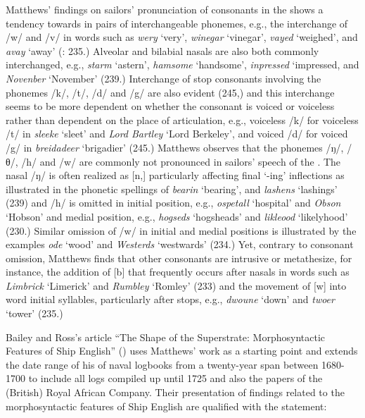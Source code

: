 Matthews’ findings on sailors’ pronunciation of consonants in the  shows a tendency towards  in pairs of interchangeable phonemes, e.g., the interchange of /w/ and /v/ in words such as \textit{wery} ‘very’, \textit{winegar} ‘vinegar’, \textit{vayed} ‘weighed’, and \textit{avay} ‘away’ (\citealt{Matthews1935}: 235.) Alveolar and bilabial nasals are also both commonly interchanged, e.g., \textit{starm} ‘astern’, \textit{hamsome} ‘handsome’, \textit{inpressed} ‘impressed, and \textit{Novenber} ‘November’ (239.) Interchange of stop consonants involving the phonemes /k/, /t/, /d/ and /g/ are also evident (245,) and this interchange seems to be more dependent on whether the consonant is voiced or voiceless rather than dependent on the place of articulation, e.g., voiceless /k/ for voiceless /t/ in \textit{sleeke} ‘sleet’ and \textit{Lord Bartley} ‘Lord Berkeley’, and voiced /d/ for voiced /g/ in \textit{breidadeer} ‘brigadier’ (245.) Matthews observes that the phonemes /ŋ/, /θ/, /h/ and /w/ are commonly not pronounced in sailors’ speech of the . The nasal /ŋ/ is often realized as [n,] particularly affecting final ‘-ing’ inflections as illustrated in the phonetic spellings of \textit{bearin} ‘bearing’, and \textit{lashens} ‘lashings’ (239) and /h/ is omitted in initial position, e.g., \textit{ospetall} ‘hospital’ and \textit{Obson} ‘Hobson’ and medial position, e.g., \textit{hogseds} ‘hogsheads’ and \textit{likleood} ‘likelyhood’ (230.) Similar omission of /w/ in initial and medial positions is illustrated by the examples \textit{ode} ‘wood’ and \textit{Westerds} ‘westwards’ (234.) Yet, contrary to consonant omission, Matthews finds that other consonants are intrusive or metathesize, for instance, the addition of [b] that frequently occurs after nasals in words such as \textit{Limbrick} ‘Limerick’ and \textit{Rumbley} ‘Romley’ (233) and the movement of [w] into word initial syllables, particularly after stops, e.g., \textit{dwoune} ‘down’ and \textit{twoer} ‘tower’ (235.)

Bailey and Ross’s article “The Shape of the Superstrate: Morphosyntactic Features of Ship English” (\citeyear*{BaileyRoss1988}) uses Matthews’ work as a starting point and extends the date range of his  of naval logbooks from a twenty-year span between 1680-1700 to include all logs compiled up until 1725 and also the papers of the (British) Royal African Company. Their presentation of findings related to the morphosyntactic features of Ship English are qualified with the statement:

